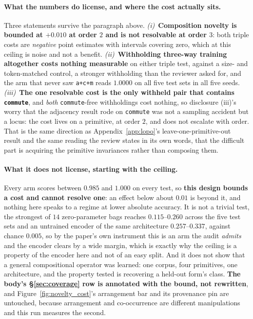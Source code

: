 \paragraph{What the numbers do license, and where the cost actually sits.} Three statements survive the paragraph above. \emph{(i)}~\textbf{Composition novelty is bounded at $+0.010$ at order $2$ and is not resolvable at order $3$}: both triple costs are \emph{negative} point estimates with intervals covering zero, which at this ceiling is noise and not a benefit. \emph{(ii)}~\textbf{Withholding three-way training altogether costs nothing measurable} on either triple test, against a size- and token-matched control, a stronger withholding than the reviewer asked for, and the arm that never saw \texttt{a+c+m} reads $1.0000$ on all five test sets in all five seeds. \emph{(iii)}~\textbf{The one resolvable cost is the only withheld pair that contains \texttt{commute}}, and \emph{both} \texttt{commute}-free withholdings cost nothing, so disclosure (iii)'s worry that the adjacency result rode on \texttt{commute} was not a sampling accident but a locus: the cost lives on a primitive, at order $2$, and does not escalate with order. That is the same direction as Appendix~\ref{app:lopo}'s leave-one-primitive-out result and the same reading the review states in its own words, that the difficult part is acquiring the primitive invariances rather than composing them.

\paragraph{What it does not license, starting with the ceiling.} Every arm scores between $0.985$ and $1.000$ on every test, so \textbf{this design bounds a cost and cannot resolve one}: an effect below about $0.01$ is beyond it, and nothing here speaks to a regime at lower absolute accuracy. It is not a trivial test, the strongest of $14$ zero-parameter bags reaches $0.115$--$0.260$ across the five test sets and an untrained encoder of the same architecture $0.257$--$0.337$, against chance $0.005$, so by the paper's own instrument this is an arm the audit \emph{admits} and the encoder clears by a wide margin, which is exactly why the ceiling is a property of the encoder here and not of an easy split. And it does not show that a general compositional operator was learned: one corpus, four primitives, one architecture, and the property tested is recovering a held-out form's class. \textbf{The body's \S\ref{sec:coverage} row is annotated with the bound, not rewritten}, and Figure~\ref{fig:novelty_cost}'s arrangement bar and its provenance pin are untouched, because arrangement and co-occurrence are different manipulations and this run measures the second.

